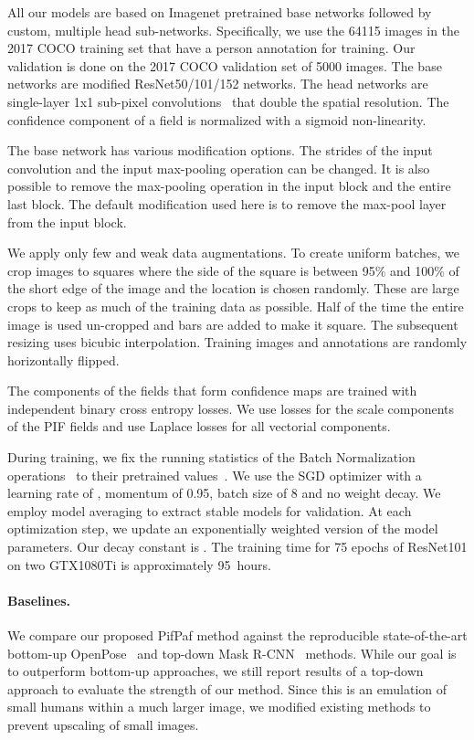 \documentclass[10pt,twocolumn,letterpaper]{article}
\begin{document}
All our models are based on Imagenet pretrained base networks followed
by custom, multiple head sub-networks. Specifically, we use the 64115 images in the 2017
COCO training set that have a person annotation for training. Our validation is done on
the 2017 COCO validation set of 5000 images. The base networks are modified
ResNet50/101/152 networks. The head networks are single-layer 1x1 sub-pixel
convolutions~\cite{shi2016real} that double the spatial resolution.
The confidence component of a field is normalized with a sigmoid non-linearity.

The base network has various modification options. The strides of the input convolution
and the input max-pooling operation can be changed.
It is also possible to remove the max-pooling operation in the input block and the entire
last block. The default modification used here is to remove the max-pool layer from the input
block.

We apply only few and weak data
augmentations. To create uniform batches, we crop images to squares where the side of the
square is between 95\% and 100\% of the short edge of the image and the location is
chosen randomly. These are large crops to keep as much of the training data as possible.
Half of the time the entire image is used un-cropped and bars are added
to make it square.
The subsequent resizing uses bicubic interpolation.
Training images and annotations are randomly horizontally flipped.

The components of the fields that form confidence maps are trained with independent binary
cross entropy losses. We use  losses for the scale components of the PIF fields and use
Laplace losses for all vectorial components.

During training, we fix the running statistics of the Batch Normalization
operations~\cite{batchnormalization} to their pretrained values~\cite{personlab}.
We use the SGD optimizer with a learning rate of , momentum of 0.95, batch size of 8 and no weight decay.
We employ model averaging to extract stable models for validation. At each optimization
step, we update an exponentially weighted version of the model parameters. Our decay
constant is .
The training time for 75 epochs of ResNet101 on two GTX1080Ti is approximately 95~hours.

\paragraph{Baselines.} We compare our proposed PifPaf method against the reproducible
state-of-the-art bottom-up OpenPose~\cite{partsaffinityfields} and top-down Mask
R-CNN~\cite{he2017mask} methods. While our goal is to outperform bottom-up approaches, we
still report results of a top-down approach to evaluate the strength of our method. Since
this is an emulation of small humans within
a much larger image, we modified existing methods to prevent upscaling of small
images.
\end{document}
